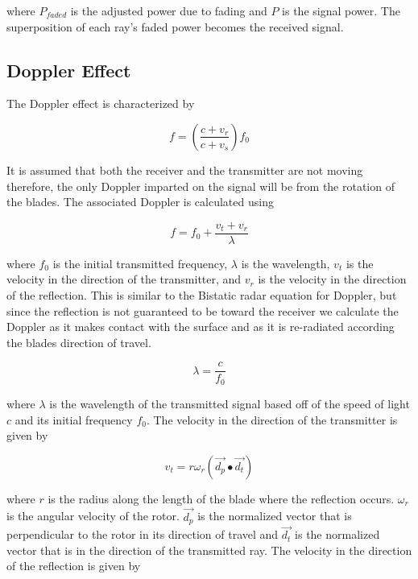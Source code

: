 where $P_{faded}$ is the adjusted power due to fading and $P$ is the signal power. The superposition of each ray's faded power becomes the received signal.

\subsection{Doppler Effect}
The Doppler effect is characterized by

\begin{equation}
	f = \left ( \frac{c + v_r}{c + v_s} \right ) f_0
	\label{eqn:formalDop}
\end{equation}

It is assumed that both the receiver and the transmitter are not moving therefore, the only Doppler imparted on the signal will be from the rotation of the blades. The associated Doppler is calculated using

\begin{equation}
	f = f_0 + \frac{v_t + v_r}{\lambda} %
	\label{eqn:observedShift}	
\end{equation}

where $f_0$ is the initial transmitted frequency, $\lambda$ is the wavelength, $v_t$ is the velocity in the direction of the transmitter, and $v_r$ is the velocity in the direction of the reflection. This is similar to the Bistatic radar equation for Doppler, but since the reflection is not guaranteed to be toward the receiver we calculate the Doppler as it makes contact with the surface and as it is re-radiated according the blades direction of travel.

\begin{equation}
	\lambda = \frac{c}{f_0}
	\label{eqn:wavelength}
\end{equation}

where $\lambda$ is the wavelength of the transmitted signal based off of the speed of light $c$ and its initial frequency $f_0$. The velocity in the direction of the transmitter is given by

\begin{equation}
	v_t = r \omega_r (\vec{d_p} \bullet \vec{d_t})
	\label{eqn:v_t}
\end{equation}

where $r$ is the radius along the length of the blade where the reflection occurs. $\omega_r$ is the angular velocity of the rotor. $\vec{d_p}$ is the normalized vector that is perpendicular to the rotor in its direction of travel and $\vec{d_t}$ is the normalized vector that is in the direction of the transmitted ray. The velocity in the direction of the reflection is given by

